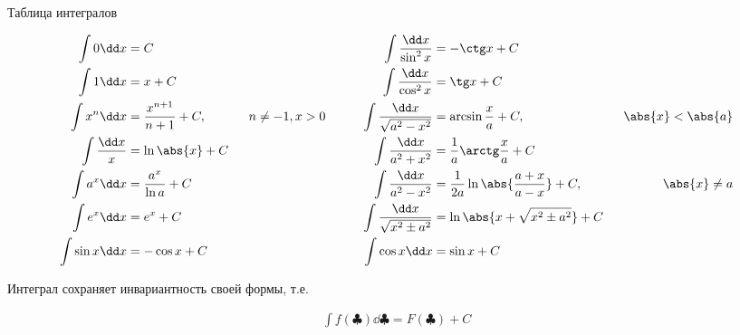 
\begin{remark}
  Таблица интегралов

  \begin{align*}
    \int 0 \dd x & = C
    && \qquad &
      \int \frac{\dd x}{\sin^2 x} & = -\ctg x + C
    \\
      \int 1 \dd x & = x + C
    && \qquad &
      \int \frac{\dd x}{\cos^2 x} & = \tg x + C
    \\
      \int x^n \dd x & = \frac{x^{n + 1}}{n + 1} + C,
      & \hspace{6pt} n \neq -1, x > 0
    & \qquad &
      \int \frac{\dd x}{\sqrt{a^2 - x^2}} & = \arcsin \frac{x}{a} + C,
      & \hspace{6pt} \abs{x} < \abs{a}
    \\
      \int \frac{\dd x}{x} & = \ln \abs{x} + C
    && \qquad &
      \int \frac{\dd x}{a^2 + x^2} & = \frac{1}{a} \arctg \frac{x}{a} + C
    \\
      \int a^{x} \dd x & = \frac{a^{x}}{\ln a} + C
    && \qquad &
      \int \frac{\dd x}{a^2 - x^2}
      & = \frac{1}{2a} \ln \abs{\frac{a + x}{a - x}} + C,
      & \hspace{6pt} \abs{x} \neq a
    \\
      \int e^{x} \dd x & = e^{x} + C
    && \qquad &
      \int \frac{\dd x}{\sqrt{x^2 \pm a^2}}
      & = \ln \abs{x + \sqrt{x^2 \pm a^2}} + C
    \\
      \int \sin x \dd x & = -\cos x + C
    && \qquad &
      \int \cos x \dd x & = \sin x + C
  \end{align*}
\end{remark}

\begin{remark}
  Интеграл сохраняет инвариантность своей формы, т.е.

  \begin{align*}
    \int f(\clubsuit) \dd \clubsuit = F(\clubsuit) + C
  \end{align*}
\end{remark}

